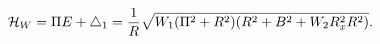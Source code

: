 \begin{equation}
\label{edens1}
{\cal H}_{W} = \Pi E + \bigtriangleup_1
= \frac{1}{R}
\sqrt{W_1 (\Pi^2 + R^2) (R^2 + B^2 + W_2 R_x^2 R^2)}.
\end{equation}

